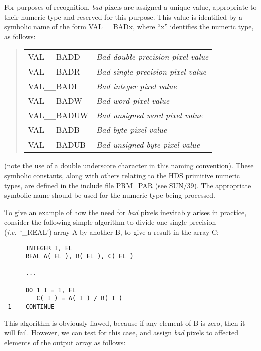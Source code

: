 \documentclass[twoside,11pt]{article}
\newcommand{\xref}[3]{#1}
\newcommand{\st}[1]{{\em{#1}}}
\begin{document}
For purposes of recognition, \st{bad\/} pixels are assigned a unique value,
appropriate to their numeric type and reserved for this purpose. 
This value is identified by a symbolic name of the form VAL\_\_BADx, where
``x'' identifies the numeric type, as follows: 

\small
\begin{quote}
\begin{center}
\begin{tabular}{l@{ --- }l}
VAL\_\_BADD & \st{Bad double-precision pixel value}\\
VAL\_\_BADR & \st{Bad single-precision pixel value}\\
VAL\_\_BADI & \st{Bad integer pixel value}\\
VAL\_\_BADW & \st{Bad word pixel value}\\
VAL\_\_BADUW & \st{Bad unsigned word pixel value}\\
VAL\_\_BADB & \st{Bad byte pixel value}\\
VAL\_\_BADUB & \st{Bad unsigned byte pixel value}
\end{tabular}
\end{center}
\end{quote}
\normalsize

(note the use of a double underscore character in this naming convention).
These symbolic constants, along with others relating to the \xref{HDS
primitive numeric types}{sun92}{table_of_HDS_data_types}, are defined
in the include file PRM\_PAR (see \xref{SUN/39}{sun39}{}).
The appropriate symbolic name should be used for the numeric type being
processed. 


To give an example of how the need for \st{bad\/} pixels inevitably arises in
practice, consider the following simple algorithm to divide one
single-precision (\st{i.e.}\ `\_REAL') array A by another B, to give a result
in the array C: 

\small
\begin{verbatim}
      INTEGER I, EL
      REAL A( EL ), B( EL ), C( EL )

      ...

      DO 1 I = 1, EL
         C( I ) = A( I ) / B( I )
 1    CONTINUE
\end{verbatim}
\normalsize

This algorithm is obviously flawed, because if any element of B is zero,
then it will fail. 
However, we can test for this case, and assign \st{bad\/} pixels to affected
elements of the output array as follows: 
\end{document}
